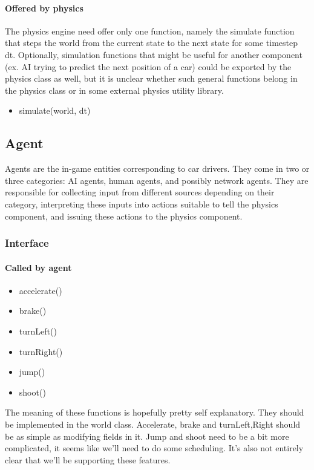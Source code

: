 \documentclass[12pt]{article}
\begin{document}
\paragraph{Offered by physics}
The physics engine need offer only one function, namely the simulate function
that steps the world from the current state to the next state for some timestep
dt. Optionally, simulation functions that might be useful for another component
(ex. AI trying to predict the next position of a car) could be exported by
the physics class as well, but it is unclear whether such general functions
belong in the physics class or in some external physics utility library.

\begin{itemize}
\item simulate(world, dt)
\end{itemize}

\subsection{Agent}
Agents are the in-game entities corresponding to car drivers. They come in
two or three categories: AI agents, human agents, and possibly network agents.
They are responsible for collecting input from different sources depending on
their category, interpreting these inputs into actions suitable to tell the
physics component, and issuing these actions to the physics component.

\subsubsection{Interface}

\paragraph{Called by agent}
\begin{itemize}
\item accelerate()
\item brake()
\item turnLeft()
\item turnRight()
\item jump()
\item shoot()
\end{itemize}
The meaning of these functions is hopefully pretty self explanatory. They should be implemented in the world class. Accelerate, brake and turn{Left,Right} should be as simple as modifying fields in it.
Jump and shoot need to be a bit more complicated, it seems like we'll need to do some scheduling. It's also not entirely clear that we'll be supporting these features.
\end{document}
